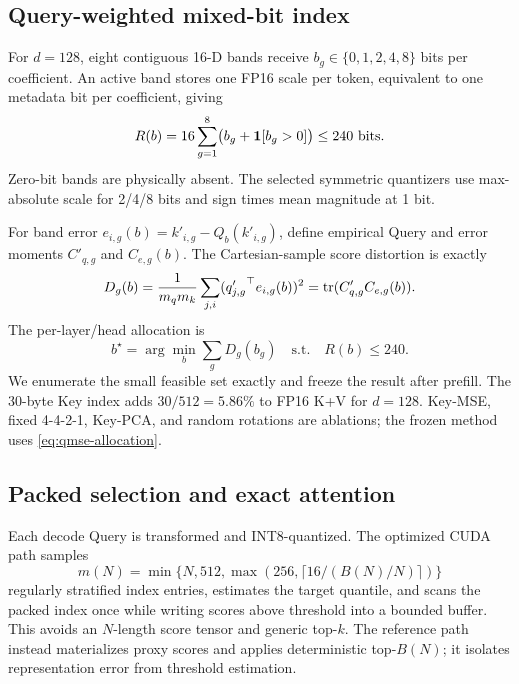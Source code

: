 \subsection{Query-weighted mixed-bit index}

For $d=128$, eight contiguous 16-D bands receive
$b_g\in\{0,1,2,4,8\}$ bits per coefficient.  An active band stores one FP16
scale per token, equivalent to one metadata bit per coefficient, giving
\begin{equation}
 R(b)=16\sum_{g=1}^{8}\bigl(b_g+\mathbf{1}[b_g>0]\bigr)\le240\text{ bits}.
 \label{eq:packed-rate}
\end{equation}
Zero-bit bands are physically absent.  The selected symmetric quantizers use
max-absolute scale for 2/4/8 bits and sign times mean magnitude at 1 bit.

For band error $e_{i,g}(b)=k'_{i,g}-Q_b(k'_{i,g})$, define empirical Query
and error moments $C'_{q,g}$ and $C_{e,g}(b)$.  The Cartesian-sample score
distortion is exactly
\begin{equation}
 D_g(b)=\frac{1}{m_qm_k}\sum_{j,i}
 ({q'_{j,g}}^\top e_{i,g}(b))^2
 =\operatorname{tr}(C'_{q,g}C_{e,g}(b)).
 \label{eq:band-qmse}
\end{equation}
The per-layer/head allocation is
\begin{equation}
 b^\star=\arg\min_b\sum_gD_g(b_g)\quad\text{s.t.}\quad R(b)\le240.
 \label{eq:qmse-allocation}
\end{equation}
We enumerate the small feasible set exactly and freeze the result after
prefill.  The 30-byte Key index adds $30/512=5.86\%$ to FP16 K+V for
$d=128$.  Key-MSE, fixed 4-4-2-1, Key-PCA, and random rotations are ablations;
the frozen method uses \cref{eq:qmse-allocation}.

\subsection{Packed selection and exact attention}

Each decode Query is transformed and INT8-quantized.  The optimized CUDA
path samples
\begin{equation}
 m(N)=\min\{N,512,\max(256,\lceil16/(B(N)/N)\rceil)\}
 \label{eq:frozen-quantile-samples}
\end{equation}
regularly stratified index entries, estimates the target quantile, and scans
the packed index once while writing scores above threshold into a bounded
buffer.  This avoids an $N$-length score tensor and generic top-$k$.  The
reference path instead materializes proxy scores and applies deterministic
top-$B(N)$; it isolates representation error from threshold estimation.

